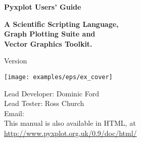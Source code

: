 \newcommand{\nlnp} {\\\hspace{8mm}}
\newcommand{\nlscf}{\vspace{3mm}\\\noindent}
\newcommand{\nlfcf}{\vspace{3mm}\\\hspace{8mm}}



\begin{titlepage}
\normalsize
\vspace*{0.4cm}
\begin{center}
{\Huge \bf Pyxplot Users' Guide}\\
\end{center}
\vspace*{0.5cm}
\begin{center}
{\LARGE \bf A Scientific Scripting Language, \\ \vspace{2mm} Graph Plotting Suite and \\ \vspace{2mm} Vector Graphics Toolkit. \\}
\end{center}
\vspace*{0.4cm}
\begin{center}
{\Large Version \version \\}
\end{center}
\vspace*{0.0cm}
\begin{center}
\texttt{[image: examples/eps/ex\_cover]}
\end{center}
\vspace*{0.2cm}
\begin{center}
{\large
Lead Developer: Dominic Ford \\
\vspace{1mm}
Lead Tester: Ross Church \\ 
\vspace{2mm}
Email:  \\
\vspace{4mm}
This manual is also available in HTML, at \\
\url{http://www.pyxplot.org.uk/0.9/doc/html/} \\
}
\end{center}
\vspace*{0.5cm}
\begin{center}
{\Large \reldate \\}
\end{center}
\end{titlepage}

